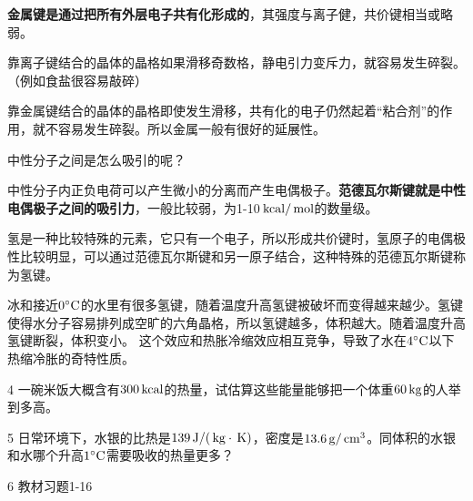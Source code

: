\documentclass[CJK]{beamer}
\begin{document}
\begin{frame}
\bch

{\bf 金属键是通过把所有外层电子共有化形成的}，其强度与离子健，共价键相当或略弱。

\skipline

靠离子键结合的晶体的晶格如果滑移奇数格，静电引力变斥力，就容易发生碎裂。（例如食盐很容易敲碎）

\skipline

靠金属键结合的晶体的晶格即使发生滑移，共有化的电子仍然起着“粘合剂”的作用，就不容易发生碎裂。所以金属一般有很好的延展性。

\ech
\end{frame}

\begin{frame}
\bch

中性分子之间是怎么吸引的呢？

\skipline

中性分子内正负电荷可以产生微小的分离而产生电偶极子。{\bf 范德瓦尔斯键就是中性电偶极子之间的吸引力}，一般比较弱，为1-10$\,\mathrm{kcal}/\,\mathrm{mol}$的数量级。
\ech
\end{frame}

\begin{frame}
\bch
氢是一种比较特殊的元素，它只有一个电子，所以形成共价键时，氢原子的电偶极性比较明显，可以通过范德瓦尔斯键和另一原子结合，这种特殊的范德瓦尔斯键称为氢键。

\skipline


冰和接近$0^\circ \mathrm{C}$的水里有很多氢键，随着温度升高氢键被破坏而变得越来越少。氢键使得水分子容易排列成空旷的六角晶格，所以氢键越多，体积越大。随着温度升高氢键断裂，体积变小。
这个效应和热胀冷缩效应相互竞争，导致了水在$4^\circ \mathrm{C}$以下热缩冷胀的奇特性质。


\ech
\end{frame}


\begin{frame}
\bch
\bitem
\item[4]{一碗米饭大概含有$300\,\mathrm{kcal}$的热量，试估算这些能量能够把一个体重$60\,\mathrm{kg}$的人举到多高。}
\item[5]{日常环境下，水银的比热是$139 \,\mathrm{J}/(\,\mathrm{kg}\cdot\,\mathrm{K})$，密度是$13.6\,\mathrm{g}/\,\mathrm{cm}^3$。同体积的水银和水哪个升高$1^\circ \mathrm{C}$需要吸收的热量更多？}
\item[6]{教材习题1-16}
\eitem
\ech
\end{frame}
\end{document}
